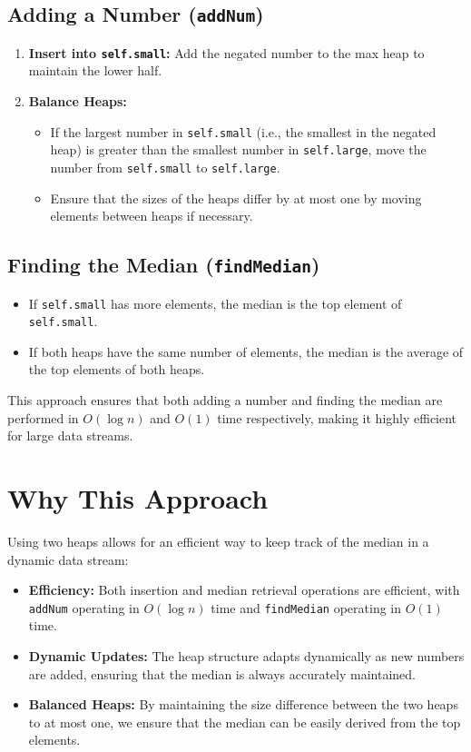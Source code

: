 \subsection*{Adding a Number (\texttt{addNum})}
\begin{enumerate}
    \item \textbf{Insert into \texttt{self.small}:} Add the negated number to the max heap to maintain the lower half.
    \item \textbf{Balance Heaps:}
    \begin{itemize}
        \item If the largest number in \texttt{self.small} (i.e., the smallest in the negated heap) is greater than the smallest number in \texttt{self.large}, move the number from \texttt{self.small} to \texttt{self.large}.
        \item Ensure that the sizes of the heaps differ by at most one by moving elements between heaps if necessary.
    \end{itemize}
\end{enumerate}

\subsection*{Finding the Median (\texttt{findMedian})}
\begin{itemize}
    \item If \texttt{self.small} has more elements, the median is the top element of \texttt{self.small}.
    \item If both heaps have the same number of elements, the median is the average of the top elements of both heaps.
\end{itemize}

This approach ensures that both adding a number and finding the median are performed in \(O(\log n)\) and \(O(1)\) time respectively, making it highly efficient for large data streams.

\section*{Why This Approach}

Using two heaps allows for an efficient way to keep track of the median in a dynamic data stream:

\begin{itemize}
    \item \textbf{Efficiency:} Both insertion and median retrieval operations are efficient, with \texttt{addNum} operating in \(O(\log n)\) time and \texttt{findMedian} operating in \(O(1)\) time.
    
    \item \textbf{Dynamic Updates:} The heap structure adapts dynamically as new numbers are added, ensuring that the median is always accurately maintained.
    
    \item \textbf{Balanced Heaps:} By maintaining the size difference between the two heaps to at most one, we ensure that the median can be easily derived from the top elements.
\end{itemize}

